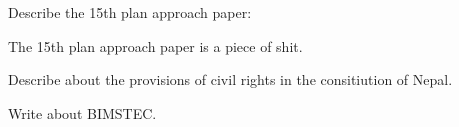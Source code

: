 \section*{}

\subsection*{}

\begin{questions}

\question Describe the 15th plan approach paper:
  \begin{solution}
  The 15th plan approach paper is a piece of shit.
  \end{solution}

\question Describe about the provisions of civil rights in the consitiution of Nepal.

\question Write about BIMSTEC.
  \fillwithlines{2in}

\end{questions}

\subsection*{}

\begin{questions}

\question

\end{questions}
